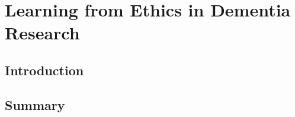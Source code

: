 \chapter{Learning from Ethics in Dementia Research}
\label{EthicsChapter}

\section{Introduction}
\label{Ethics:Intro}

\section{Summary}
\label{Ethics:Summary}